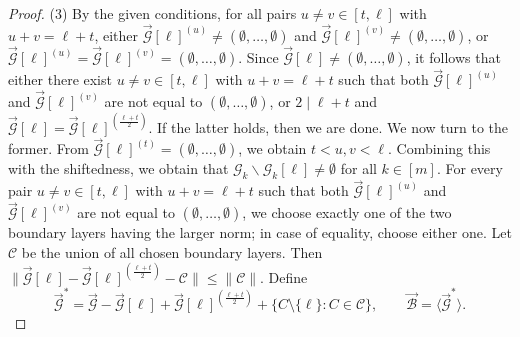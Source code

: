 \documentclass[11pt,a4paper]{article}
\begin{document}
\begin{proof}
(3)   By the given conditions,  for all pairs $u\neq v\in [t,\ell]$ with  $u+v=\ell+t$, either $\vec{\mathcal{G}}[\ell]^{(u)}\neq (\emptyset,\ldots, \emptyset)$ and $\vec{\mathcal{G}}[\ell]^{(v)}\neq (\emptyset,\ldots, \emptyset)$, or $\vec{\mathcal{G}}[\ell]^{(u)}=\vec{\mathcal{G}}[\ell]^{(v)}=(\emptyset,\ldots, \emptyset)$.
Since $\vec{\mathcal{G}}[\ell]\neq (\emptyset,\ldots, \emptyset)$, it follows  that either there exist $u\neq v\in [t,\ell]$ with  $u+v=\ell+t$ such that both $\vec{\mathcal{G}}[\ell]^{(u)}$ and $\vec{\mathcal{G}}[\ell]^{(v)}$ are  not equal to  $(\emptyset,\ldots, \emptyset)$, or  $2\mid \ell+t$ and $\vec{\mathcal{G}}[\ell]= \vec{\mathcal{G}}[\ell]^{(\frac{\ell+t}{2})}$. 
If the latter holds, then we are done. We now turn to the former.
From $\vec{\mathcal{G}}[\ell]^{(t)}=(\emptyset,\ldots,\emptyset)$, we obtain $t<u, v<\ell$. 
Combining this with the shiftedness, we obtain that
$\mathcal{G}_k\backslash \mathcal{G}_k[\ell]\neq \emptyset$  for all $k\in[m]$.
For every pair
$u\neq v\in [t,\ell]$ with $u+v=\ell+t$ such that both
$\vec{\mathcal{G}}[\ell]^{(u)}$ and $\vec{\mathcal{G}}[\ell]^{(v)}$ are not equal to
$(\emptyset,\ldots,\emptyset)$,  we choose exactly one of the two boundary layers having
the larger norm; in case of equality, choose either one.
Let $\mathcal C$ be the union of all chosen boundary layers.
Then $\|\vec{\mathcal{G}}[\ell]-\vec{\mathcal{G}}[\ell]^{(\frac{\ell+t}{2})}- \mathcal C\|\leq \|\mathcal C\|$.
Define 
$$
\vec{\mathcal{G}}^*
=
\vec{\mathcal{G}}-\vec{\mathcal{G}}[\ell]+\vec{\mathcal{G}}[\ell]^{(\frac{\ell+t}{2})}+
\{C\setminus\{\ell\}:C\in\mathcal C\},\qquad \vec{\mathcal{B}}=\langle\vec{\mathcal{G}}^*\rangle.
$$


\end{proof}
\end{document}
